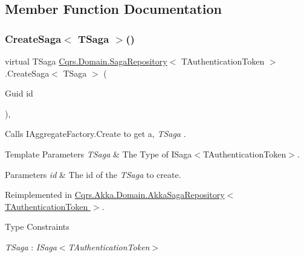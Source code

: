 \subsection{Member Function Documentation}
\mbox{\label{classCqrs_1_1Domain_1_1SagaRepository_acb23e0bd3e5655547a13b4ad2b06e548_acb23e0bd3e5655547a13b4ad2b06e548}} 
\subsubsection{\texorpdfstring{Create\+Saga$<$ T\+Saga $>$()}{CreateSaga< TSaga >()}}
{\footnotesize\ttfamily virtual T\+Saga \hyperlink{classCqrs_1_1Domain_1_1SagaRepository}{Cqrs.\+Domain.\+Saga\+Repository}$<$ T\+Authentication\+Token $>$.Create\+Saga$<$ T\+Saga $>$ (\begin{DoxyParamCaption}\item[{Guid}]{id }\end{DoxyParamCaption})\hspace{0.3cm}{\ttfamily [protected]}, {\ttfamily [virtual]}}



Calls I\+Aggregate\+Factory.\+Create to get a, {\itshape T\+Saga} . 


\begin{DoxyTemplParams}{Template Parameters}
{\em T\+Saga} & The Type of I\+Saga$<$\+T\+Authentication\+Token$>$.\\
\hline
\end{DoxyTemplParams}

\begin{DoxyParams}{Parameters}
{\em id} & The id of the {\itshape T\+Saga}  to create.\\
\hline
\end{DoxyParams}


Reimplemented in \hyperlink{classCqrs_1_1Akka_1_1Domain_1_1AkkaSagaRepository_a2c7263d0e58d2b31149ec685d5be934a_a2c7263d0e58d2b31149ec685d5be934a}{Cqrs.\+Akka.\+Domain.\+Akka\+Saga\+Repository$<$ T\+Authentication\+Token $>$}.

\begin{Desc}
\item[Type Constraints]\begin{description}
\item[{\em T\+Saga} : {\em I\+Saga$<$T\+Authentication\+Token$>$}]\end{description}
\end{Desc}
\mbox{\label{classCqrs_1_1Domain_1_1SagaRepository_a1b80ecc2a5719d1681ca5d182a252120_a1b80ecc2a5719d1681ca5d182a252120}} 
